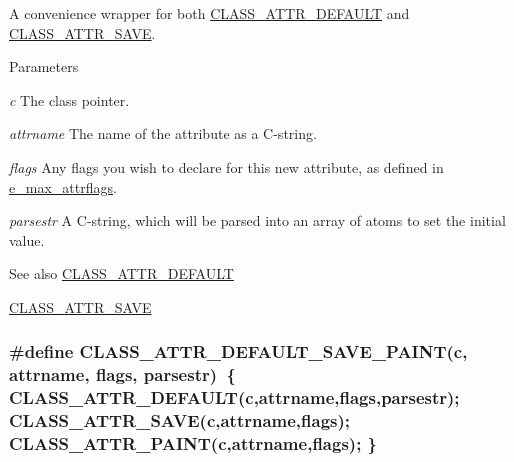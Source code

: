 A convenience wrapper for both \hyperlink{group__attr_ga91196b43f49d6769e6fe2df99f5c7c77}{CLASS\_\-ATTR\_\-DEFAULT} and \hyperlink{group__attr_gaf56dc31d0defad3cdc1ee60b611acc79}{CLASS\_\-ATTR\_\-SAVE}. 
\begin{DoxyParams}{Parameters}
\item[{\em c}]The class pointer. \item[{\em attrname}]The name of the attribute as a C-\/string. \item[{\em flags}]Any flags you wish to declare for this new attribute, as defined in \hyperlink{group__attr_gaf296cfc6741bb19207f6ed8062809115}{e\_\-max\_\-attrflags}. \item[{\em parsestr}]A C-\/string, which will be parsed into an array of atoms to set the initial value. \end{DoxyParams}
\begin{DoxySeeAlso}{See also}
\hyperlink{group__attr_ga91196b43f49d6769e6fe2df99f5c7c77}{CLASS\_\-ATTR\_\-DEFAULT} 

\hyperlink{group__attr_gaf56dc31d0defad3cdc1ee60b611acc79}{CLASS\_\-ATTR\_\-SAVE} 
\end{DoxySeeAlso}
\hypertarget{group__attr_ga55677c851b0822e7852dc3742046b77c}{
\subsubsection[{CLASS\_\-ATTR\_\-DEFAULT\_\-SAVE\_\-PAINT}]{\setlength{\rightskip}{0pt plus 5cm}\#define CLASS\_\-ATTR\_\-DEFAULT\_\-SAVE\_\-PAINT(c, \/  attrname, \/  flags, \/  parsestr)~\{ CLASS\_\-ATTR\_\-DEFAULT(c,attrname,flags,parsestr); CLASS\_\-ATTR\_\-SAVE(c,attrname,flags); CLASS\_\-ATTR\_\-PAINT(c,attrname,flags); \}}}
\label{group__attr_ga55677c851b0822e7852dc3742046b77c}


